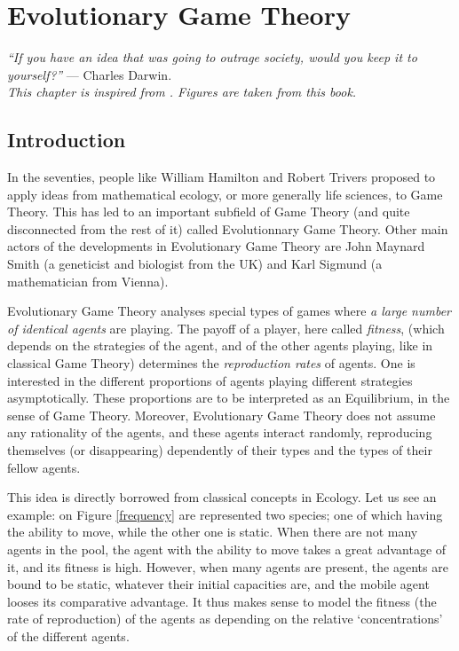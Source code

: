 \ifx \globalmark \undefined %

\else
\fi

\chapter{Evolutionary Game Theory}
\label{chap:Evol}
{\large{\itshape
``If you have an idea that was going to outrage society, would you keep it to yourself?''} --- Charles Darwin.\\
}
  {\small{\itshape
This chapter is inspired from \cite{NoED}.  Figures are taken from this book.}\\
}
\emph{}

\section{Introduction}
In the seventies, people like
William Hamilton and Robert Trivers proposed to apply ideas from mathematical ecology,
or more generally life sciences, to Game Theory.  This has led to an important subfield of Game Theory (and quite disconnected from the rest of it)
called Evolutionnary Game Theory. Other main actors of the developments in Evolutionary Game Theory are John Maynard Smith
 \cite{SmPrTLOA} (a geneticist and biologist from the UK) and Karl Sigmund (a mathematician from Vienna).

Evolutionary Game Theory analyses special types of games where \emph{a large number of identical agents} are playing.
The payoff of a player, here called \emph{fitness}, (which depends on the strategies of the agent, and of the other agents playing,
like in classical Game Theory) determines the \emph{reproduction rates} of agents.
One is interested in the different proportions of agents playing different strategies asymptotically.
 These proportions are to be interpreted as an Equilibrium, in the sense of Game Theory.
 Moreover, Evolutionary Game Theory does not assume any rationality of the agents, and these agents interact randomly, reproducing themselves (or disappearing) dependently of their types and the types of their fellow agents.

This idea is directly borrowed from classical concepts in Ecology. Let us see an example: on Figure \ref{frequency} are represented two species; one of which having the ability to move, while the other one is static.  When there are not many agents in the pool, the agent with the ability to move takes a great advantage of it, and its fitness is high.  However, when many agents are present, the agents are bound to be static, whatever their initial capacities are, and the mobile agent looses its comparative advantage.  It thus makes sense to model the fitness (the rate of reproduction) of the agents as depending on the relative `concentrations' of the different agents.

